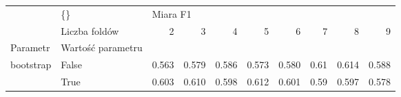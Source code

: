 \begin{tabular}{llrrrrrrrr}
\hline
          & \{\} & \multicolumn{8}{l}{Miara F1} \\
          & Liczba foldów &        2 &      3 &      4 &      5 &      6 &     7 &      8 &      9 \\
Parametr & Wartość parametru &          &        &        &        &        &       &        &        \\
\hline
bootstrap & False &    0.563 &  0.579 &  0.586 &  0.573 &  0.580 &  0.61 &  0.614 &  0.588 \\
          & True &    0.603 &  0.610 &  0.598 &  0.612 &  0.601 &  0.59 &  0.597 &  0.578 \\
\hline
\end{tabular}
